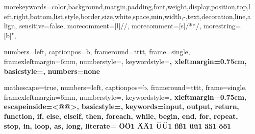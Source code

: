 

{morekeywords={color,background,margin,padding,font,weight,display,position,top,left,right,bottom,list,style,border,size,white,space,min,width,-,text,decoration,line,align},
sensitive=false,
morecomment=[l]{//},
morecomment=[s]{/*}{*/},
morestring=[b]",
}

 {
numbers=left,
captionpos=b,
frameround=tttt,
frame=single,
framexleftmargin=6mm,
numberstyle=\tiny,
keywordstyle=\ttfamily\bfseries,
xleftmargin=0.75cm,
basicstyle=\ttfamily,
numbers=none
}

 {
mathescape=true,
numbers=left,
captionpos=b,
frameround=tttt,
frame=single,
framexleftmargin=6mm,
numberstyle=\tiny,
keywordstyle=\ttfamily\bfseries,
xleftmargin=0.75cm,
escapeinside={<@}{@>},
basicstyle=\ttfamily,
keywords={input, output, return, function, if, else, elseif, then, foreach, while, begin, end, for, repeat, stop, in, loop, as, long},
literate=%
  {Ö}{{\"O}}1
  {Ä}{{\"A}}1
  {Ü}{{\"U}}1
  {ß}{{\ss}}1
  {ü}{{\"u}}1
  {ä}{{\"a}}1
  {ö}{{\"o}}1
}
